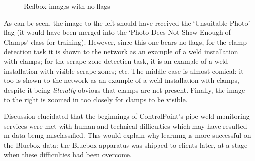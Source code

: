 \documentclass[a4paper,11pt]{article}
\begin{document}
\begin{figure}[h]
    \caption{Redbox images with no flags}
    \label{materialflowChart}
    \label{f35}
\end{figure}

As can be seen, the image to the left should have received the `Unsuitable Photo' flag (it would have been merged into the `Photo Does Not Show Enough of Clamps' class for training). However, since this one bears no flags, for the clamp detection task it is shown to the network as an example of a weld installation with clamps; for the scrape zone detection task, it is an example of a weld installation with visible scrape zones; etc. The middle case is almost comical: it too is shown to the network as an example of a weld installation with clamps, despite it being \textit{literally} obvious that clamps are not present. Finally, the image to the right is zoomed in too closely for clamps to be visible. 

Discussion elucidated that the beginnings of ControlPoint's pipe weld monitoring services were met with human and technical difficulties which may have resulted in data being misclassified. This would explain why learning is more successful on the Bluebox data: the Bluebox apparatus was shipped to clients later, at a stage when these difficulties had been overcome.
\end{document}
